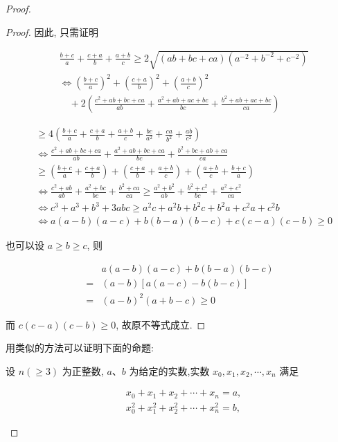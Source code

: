 \begin{proof}
\begin{example}
\begin{proof}
	因此, 只需证明
	
	$$
	\begin{aligned}
	& \frac{b+c}{a}+\frac{c+a}{b}+\frac{a+b}{c} \geqslant 2 \sqrt{(a b+b c+c a)\left(a^{-2}+b^{-2}+c^{-2}\right)} \\
	& \Leftrightarrow\left(\frac{b+c}{a}\right)^{2}+\left(\frac{c+a}{b}\right)^{2}+\left(\frac{a+b}{c}\right)^{2} \\
	& \quad+2\left(\frac{c^{2}+a b+b c+c a}{a b}+\frac{a^{2}+a b+a c+b c}{b c}+\frac{b^{2}+a b+a c+b c}{c a}\right)
	\end{aligned}
	$$
	
	$$
	\begin{aligned}
	& \geqslant 4\left(\frac{b+c}{a}+\frac{c+a}{b}+\frac{a+b}{c}+\frac{b c}{a^{2}}+\frac{c a}{b^{2}}+\frac{a b}{c^{2}}\right) \\
	& \Leftrightarrow \frac{c^{2}+a b+b c+c a}{a b}+\frac{a^{2}+a b+b c+c a}{b c}+\frac{b^{2}+b c+a b+c a}{c a} \\
	& \geqslant\left(\frac{b+c}{a}+\frac{c+a}{b}\right)+\left(\frac{c+a}{b}+\frac{a+b}{c}\right)+\left(\frac{a+b}{c}+\frac{b+c}{a}\right) \\
	& \Leftrightarrow \frac{c^{2}+a b}{a b}+\frac{a^{2}+b c}{b c}+\frac{b^{2}+c a}{c a} \geqslant \frac{a^{2}+b^{2}}{a b}+\frac{b^{2}+c^{2}}{b c}+\frac{a^{2}+c^{2}}{c a} \\
	& \Leftrightarrow c^{3}+a^{3}+b^{3}+3 a b c \geqslant a^{2} c+a^{2} b+b^{2} c+b^{2} a+c^{2} a+c^{2} b \\
	& \Leftrightarrow a(a-b)(a-c)+b(b-a)(b-c)+c(c-a)(c-b) \geqslant 0
	\end{aligned}
	$$
	
	也可以设 $a \geqslant b \geqslant c$, 则
	
	$$
	\begin{aligned}
	& a(a-b)(a-c)+b(b-a)(b-c) \\
	= & (a-b)[a(a-c)-b(b-c)] \\
	= & (a-b)^{2}(a+b-c) \geqslant 0
	\end{aligned}
	$$
	
	而 $c(c-a)(c-b) \geqslant 0$, 故原不等式成立.
\end{proof}
\begin{note}
	用类似的方法可以证明下面的命题:
	
	设 $n(\geqslant 3)$ 为正整数, $a 、 b$ 为给定的实数,实数 $x_{0}, x_{1}, x_{2}, \cdots, x_{n}$ 满足
	
	$$
	\begin{aligned}
	& x_{0}+x_{1}+x_{2}+\cdots+x_{n}=a, \\
	& x_{0}^{2}+x_{1}^{2}+x_{2}^{2}+\cdots+x_{n}^{2}=b,
	\end{aligned}
	$$
	

\end{note}
\end{example}
\end{proof}
